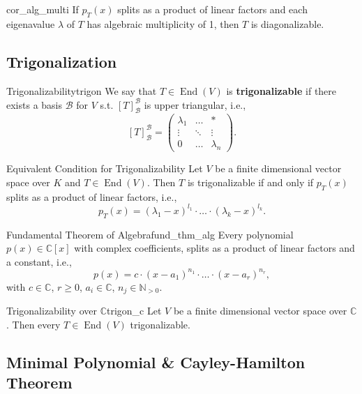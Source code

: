 \begin{corollary}{}{cor_alg_multi}
	If $p_T(x)$ splits as a product of linear factors and each eigenavalue $\lambda$ of $T$ has algebraic multiplicity of 1, then $T$ is diagonalizable.
\end{corollary}

\subsection{Trigonalization}
\begin{definition}{Trigonalizability}{trigon}
	We say that $T \in \operatorname{End}(V)$ is \textbf{trigonalizable} if there exists a basis $\mathcal{B}$ for $V$ s.t. $[T]^{\mathcal{B}}_{\mathcal{B}}$ is upper triangular, i.e.,
	\[
		[T]^{\mathcal{B}}_{\mathcal{B}} = \begin{pmatrix}
			\lambda_1 & \hdots & \ast\\
			\vdots & \ddots & \vdots \\
			0 & \hdots & \lambda_n
		\end{pmatrix}.
	\]
\end{definition}

\begin{theorem}{Equivalent Condition for Trigonalizability}
	Let $V$ be a finite dimensional vector space over $K$ and $T \in \operatorname{End}(V)$. Then $T$ is trigonalizable if and only if $p_T(x)$ splits as a product of linear factors, i.e.,
	\[
		p_T(x) = (\lambda_1 - x)^{l_1} \cdot \hdots \cdot (\lambda_k - x)^{l_k}.
	\]
\end{theorem}

\begin{theorem}{Fundamental Theorem of Algebra}{fund_thm_alg}
	Every polynomial $p(x) \in \mathbb{C}[x]$ with complex coefficients, splits as a product of linear factors and a constant, i.e., 
	\[
		p(x) = c \cdot (x - a_1)^{n_1} \cdot \hdots \cdot (x - a_r)^{n_r},
	\]
	with $c \in \mathbb{C}$, $r \geq 0$, $a_i \in \mathbb{C}$, $n_j \in \mathbb{N}_{>0}$.
\end{theorem}

\begin{corollary}{Trigonalizability over $\mathbb{C}$}{trigon_c}
	Let $V$ be a finite dimensional vector space over $\mathbb{C}$. Then every $T \in \operatorname{End}(V)$ trigonalizable.
\end{corollary}

\subsection{Minimal Polynomial \& Cayley-Hamilton Theorem}

